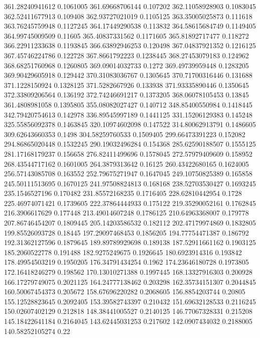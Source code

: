 361.28240941612 0.1061005
361.69668706144 0.107202
362.11058928903 0.1083045
362.52411677913 0.109408
362.93727021019 0.1105125
363.35005025873 0.111618
363.76245759948 0.1127245
364.17449290538 0.113832
364.58615684749 0.1149405
364.99745009509 0.11605
365.40837331562 0.1171605
365.81892717477 0.118272
366.22911233638 0.1193845
366.63892946253 0.120498
367.04837921352 0.1216125
367.45746224786 0.122728
367.8661792223 0.1238445
368.27453079183 0.124962
368.68251760968 0.1260805
369.09014032733 0.1272
369.49739959448 0.1283205
369.90429605918 0.129442
370.31083036767 0.1305645
370.71700316446 0.131688
371.1228150924 0.1328125
371.5282667926 0.133938
371.93335890446 0.1350645
372.33809206564 0.136192
372.74246691217 0.1373205
368.06078105453 0.13845
361.4808981058 0.1395805
355.08082027427 0.140712
348.85400550984 0.1418445
342.79420754613 0.142978
336.89545997189 0.1441125
331.15206129383 0.145248
325.55856092378 0.1463845
320.10974602098 0.147522
314.80062913791 0.1486605
309.62643660353 0.1498
304.58259760533 0.1509405
299.66473391223 0.152082
294.86865020448 0.1532245
290.19032496284 0.154368
285.62590188507 0.1555125
281.17168179237 0.156658
276.82411499696 0.1578045
272.57979409609 0.158952
268.43544717162 0.1601005
264.3879313642 0.16125
260.43422680165 0.1624005
256.57143085708 0.163552
252.79675271947 0.1647045
249.10750825389 0.165858
245.50111513695 0.1670125
241.97508824813 0.168168
238.52703530427 0.1693245
235.1546527196 0.170482
231.85572168235 0.1716405
228.62810442954 0.1728
225.46974071421 0.1739605
222.37864444933 0.175122
219.35290052161 0.1762845
216.3906617629 0.177448
213.49014607248 0.1786125
210.64963368007 0.179778
207.86746454207 0.1809445
205.14203586532 0.182112
202.47179974869 0.1832805
199.85526093728 0.18445
197.29097468453 0.1856205
194.77754471387 0.186792
192.31362127596 0.1879645
189.89789929698 0.189138
187.52911661162 0.1903125
185.2060522778 0.191488
182.9275249675 0.1926645
180.6923914316 0.193842
178.49954503219 0.1950205
176.34791434254 0.1962
174.23646180728 0.1973805
172.16418246279 0.198562
170.13010271388 0.1997445
168.13327916303 0.200928
166.17279749075 0.2021125
164.24777138462 0.203298
162.35734151307 0.2044845
160.50067454373 0.205672
158.67696220282 0.2068605
156.8854203744 0.20805
155.12528823645 0.2092405
153.39582743397 0.210432
151.69632128533 0.2116245
150.02607402129 0.212818
148.38441005527 0.2140125
146.77067328331 0.215208
145.18422641184 0.2164045
143.62445031253 0.217602
142.0907434032 0.2188005
140.58252105274 0.22
